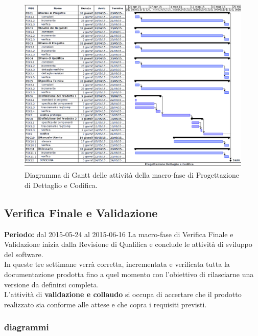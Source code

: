 \begin{figure}[h]
\begin{center}
\includegraphics[width=\textwidth, height=\textheight, keepaspectratio]{img/progdet-gantt.png}
\caption{Diagramma di Gantt delle attività della macro-fase di Progettazione di Dettaglio e Codifica.}
\end{center}
\end{figure}
\clearpage


\subsection{Verifica Finale e Validazione}
\textbf{Periodo:} dal 2015-05-24 al 2015-06-16 
La macro-fase di Verifica Finale e Validazione inizia dalla Revisione di Qualifica e conclude le attività di sviluppo del software. \\
In queste tre settimane verrà corretta, incrementata e verificata tutta la documentazione prodotta fino a quel momento con l'obiettivo di rilasciarne una versione da definirsi completa. \\
L'attività di \textbf{validazione e collaudo} si occupa di accertare che il prodotto realizzato sia conforme alle attese e che copra i requisiti previsti. \\

\newpage
\subsubsection{diagrammi}

